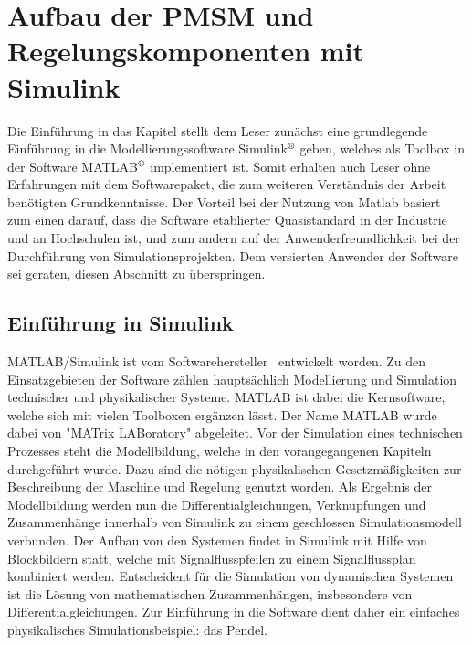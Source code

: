 
\chapter{Aufbau der PMSM und Regelungskomponenten mit Simulink}
\label{cha:regelungpmsm}

Die Einführung in das Kapitel stellt dem Leser zunächst eine grundlegende Einführung in die Modellierungssoftware  Simulink$^\text{\textregistered}$ geben, welches als Toolbox in der Software MATLAB$^\text{\textregistered}$ implementiert ist.
Somit erhalten auch Leser ohne Erfahrungen mit dem Softwarepaket, die zum weiteren Verständnis der Arbeit benötigten Grundkenntnisse.
Der Vorteil bei der Nutzung von Matlab basiert zum einen darauf, dass die Software etablierter Quasistandard in der Industrie und an Hochschulen ist, und zum andern auf der Anwenderfreundlichkeit bei der Durchführung von Simulationsprojekten. \autocite[Vorwort]{scherf2010}
Dem versierten Anwender der Software sei geraten, diesen Abschnitt zu überspringen.


\section{Einführung in Simulink}\label{sec:simulink}

MATLAB/Simulink ist vom Softwarehersteller \grqq ~entwickelt worden. Zu den Einsatzgebieten der Software zählen hauptsächlich Modellierung und Simulation technischer und physikalischer Systeme. 
MATLAB ist dabei die Kernsoftware, welche sich mit vielen Toolboxen ergänzen lässt. 
Der Name MATLAB wurde dabei von "MATrix LABoratory" abgeleitet.
Vor der Simulation eines technischen Prozesses steht die Modellbildung, welche in den vorangegangenen Kapiteln durchgeführt wurde.
Dazu sind die nötigen physikalischen Gesetzmäßigkeiten zur Beschreibung der Maschine und Regelung genutzt worden.
Als Ergebnis der Modellbildung werden nun die Differentialgleichungen, Verknüpfungen und Zusammenhänge innerhalb von Simulink zu einem geschlossen Simulationsmodell verbunden. 
Der Aufbau von den Systemen findet in Simulink mit Hilfe von Blockbildern statt, welche mit Signalflusspfeilen zu einem Signalflussplan kombiniert werden. 
Entscheident für die Simulation von dynamischen Systemen ist die Lösung von mathematischen Zusammenhängen, insbesondere von Differentialgleichungen. 
Zur Einführung in die Software dient daher ein einfaches physikalisches Simulationsbeispiel: das Pendel.

